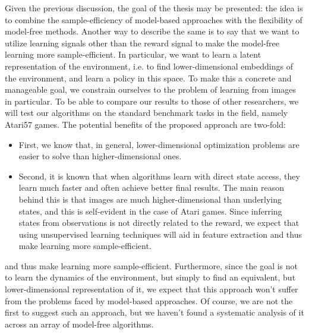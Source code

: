 Given the previous discussion, the goal of the thesis may be presented:
the idea is to combine the sample-efficiency of model-based approaches
with the flexibility of model-free methods.
Another way to describe the same is to say that we want
to utilize learning signals other than the reward signal
to make the model-free learning more sample-efficient.
In particular, we want to learn a latent representation of the environment,
i.e. to find lower-dimensional embeddings of the environment,
and learn a policy in this space.
To make this a concrete and manageable goal,
we constrain ourselves to the problem of learning from images in particular.
To be able to compare our results to those of other researchers,
we will test our algorithms on the standard benchmark tasks in the field,
namely Atari57 games.
The potential benefits of the proposed approach are two-fold:
 \begin{itemize}
    \item First, we know that, in general, lower-dimensional optimization 
			problems are easier to solve than higher-dimensional ones.
    \item Second, it is known that when algorithms learn with direct state access, 
			they learn much faster and often achieve better final results.
    The main reason behind this is that images are much 
	higher-dimensional than underlying states, 
	and this is self-evident in the case of Atari games. 
	Since inferring states from observations is not directly related to the reward,
	we expect that using unsupervised learning techniques will aid in 
	feature extraction and thus make learning more sample-efficient.
\end{itemize}
and thus make learning more sample-efficient.
Furthermore, since the goal is not to learn the dynamics of the environment,
but simply to find an equivalent, but lower-dimensional representation of it,
we expect that this approach won't suffer from the problems faced
by model-based approaches.
Of course, we are not the first to suggest such an approach,
but we haven't found a systematic analysis of it across an array of
model-free algorithms.

